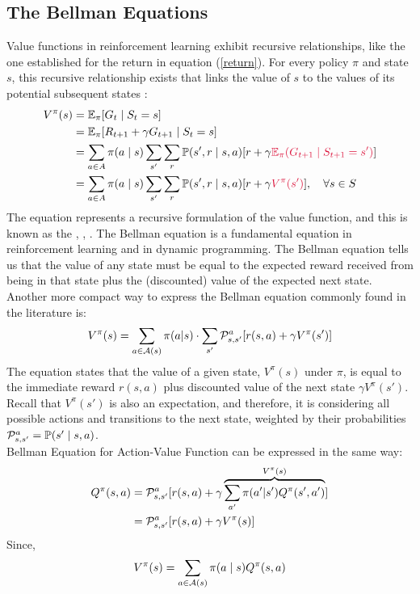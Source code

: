 \subsection{The Bellman Equations}
Value functions in reinforcement learning exhibit recursive relationships, like the one established for the return in equation (\ref{return}). For every policy $\pi$ and state $s$, this recursive relationship exists that links the value of $s$ to the values of its potential subsequent states \cite{RL}:
\begin{align*}
    V^{\pi}(s) &= \EE_{\pi}[G_t \mid S_t =s] \\
    &= \EE_{\pi}[R_{t+1} + \gamma G_{t+1} \mid S_t =s] \\
    &= \sum_{a \in A} \pi(a\mid s) \sum_{s'} \sum_{r} \PP(s',r \mid s,a) [r + \gamma \term{$\EE_{\pi} (G_{t+1} \mid S_{t+1} = s')$} ] \\
    &=\sum_{a \in A} \pi(a\mid s) \sum_{s'} \sum_{r} \PP(s',r \mid s,a) [r + \gamma \term{$V^{\pi}(s')$} ], \quad \forall s \in S
\end{align*}
The equation represents a recursive formulation of the value function, and this is known as the  \cite{RL}, \cite{RL2}, \cite{bellman1958}.
The Bellman equation is a fundamental equation in reinforcement learning and in dynamic programming. 
The Bellman equation tells us that the value of any state must be equal to the expected reward received from being in that state plus the (discounted) value of the expected next state.
Another more compact way to express the Bellman equation commonly found in the literature is: 
\begin{equation}\label{Bell1}
    V^{\pi}(s) = \sum_{a \in \mathcal A(s)} \pi(a|s) \cdot \sum_{s'} \mathcal P_{s,s'}^{a} [r(s,a) + \gamma V^{\pi}(s')]
\end{equation}
The equation states that the value of a given state, $V^{\pi}(s)$ under $\pi$, is equal to the immediate reward $r(s,a)$ plus discounted value of the next state $\gamma V^{\pi}(s')$. Recall that $V^{\pi}(s')$ is also an expectation, and therefore, it is considering all possible actions and transitions to the next state, weighted by their probabilities $\mathcal P_{s,s'}^{a} = \mathbb P(s' \mid s,a)$.
\\
Bellman Equation for Action-Value Function can be expressed in the same way:
\begin{align}
    Q^{\pi}(s,a) &= \mathcal P_{s,s'}^{a} [ r(s,a) + \gamma \overbrace{\sum_{a'} \pi(a'|s') Q^{\pi}(s',a')}^{V^{\pi}(s)}] \\
    &= \mathcal P_{s,s'}^{a} [ r(s,a) + \gamma V^{\pi}(s)]
\end{align}
Since, 
$$
V^{\pi}(s) = \sum_{a \in \mathcal A(s)} \pi(a \mid s) Q^{\pi}(s,a)
$$
